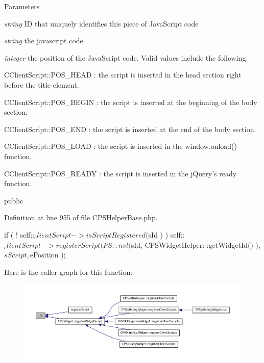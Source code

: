 \begin{DoxyParams}{Parameters}
\item[{\em string}]ID that uniquely identifies this piece of JavaScript code \item[{\em string}]the javascript code \item[{\em integer}]the position of the JavaScript code. Valid values include the following: 
\begin{DoxyItemize}
\item CClientScript::POS\_\-HEAD : the script is inserted in the head section right before the title element. 
\item CClientScript::POS\_\-BEGIN : the script is inserted at the beginning of the body section. 
\item CClientScript::POS\_\-END : the script is inserted at the end of the body section. 
\item CClientScript::POS\_\-LOAD : the script is inserted in the window.onload() function. 
\item CClientScript::POS\_\-READY : the script is inserted in the jQuery's ready function. 
\end{DoxyItemize}public \end{DoxyParams}


Definition at line 955 of file CPSHelperBase.php.




\begin{DoxyCode}
    {
        if ( ! self::$_clientScript->isScriptRegistered( $sId ) )
            self::$_clientScript->registerScript( PS::nvl( $sId, CPSWidgetHelper:
      :getWidgetId() ), $sScript, $ePosition );
    }
\end{DoxyCode}




Here is the caller graph for this function:\nopagebreak
\begin{figure}[H]
\begin{center}
\leavevmode
\includegraphics[width=400pt]{classCPSHelperBase_a982d30aee3a52f73b0e935ef7c81b03b_icgraph}
\end{center}
\end{figure}


